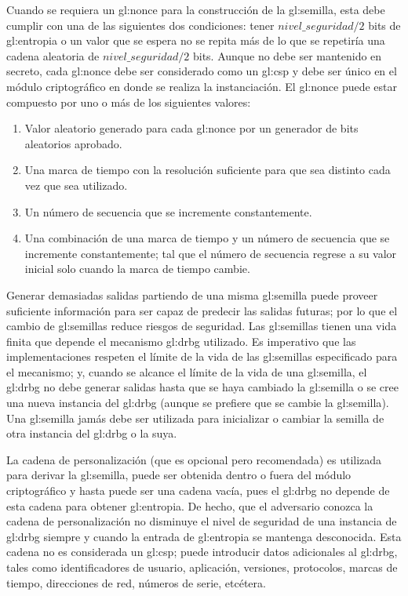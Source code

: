 Cuando se requiera un \gls{gl:nonce} para la construcción de la
\gls{gl:semilla}, esta debe cumplir con una de las siguientes dos condiciones:
tener $nivel\_seguridad/2$ bits de \gls{gl:entropia} o un valor que se espera
no se repita más de lo que se repetiría una cadena aleatoria de
$nivel\_seguridad/2$ bits. Aunque no debe ser mantenido en secreto, cada
\gls{gl:nonce} debe ser considerado como un \gls{gl:csp} y debe ser único en
el módulo criptográfico en donde se realiza la instanciación. El \gls{gl:nonce}
puede estar compuesto por uno o más de los siguientes valores:
\begin{enumerate}
  \item Valor aleatorio generado para cada \gls{gl:nonce} por un generador
    de bits aleatorios aprobado.
  \item Una marca de tiempo con la resolución suficiente para que sea distinto
    cada vez que sea utilizado.
  \item Un número de secuencia que se incremente constantemente.
  \item Una combinación de una marca de tiempo y un número de secuencia que se
    incremente constantemente; tal que el número de secuencia regrese a su
    valor inicial solo cuando la marca de tiempo cambie.
\end{enumerate}

Generar demasiadas salidas partiendo de una misma \gls{gl:semilla} puede proveer
suficiente información para ser capaz de predecir las salidas futuras; por lo
que el cambio de \glspl{gl:semilla} reduce riesgos de seguridad. Las
\glspl{gl:semilla} tienen una vida finita que depende el mecanismo \gls{gl:drbg}
utilizado. Es imperativo que las implementaciones respeten el límite de la vida
de las \glspl{gl:semilla} especificado para el mecanismo; y, cuando se alcance
el límite de la vida de una \gls{gl:semilla}, el \gls{gl:drbg} no debe generar
salidas hasta que se haya cambiado la \gls{gl:semilla} o se cree una nueva
instancia del \gls{gl:drbg} (aunque se prefiere que se cambie la
\gls{gl:semilla}). Una \gls{gl:semilla} jamás debe ser utilizada para
inicializar o cambiar la semilla de otra instancia del \gls{gl:drbg} o la suya.

La cadena de personalización (que es opcional pero recomendada) es utilizada
para derivar la \gls{gl:semilla}, puede ser obtenida dentro o fuera del
módulo criptográfico y hasta puede ser una cadena vacía, pues el \gls{gl:drbg}
no depende de esta cadena para obtener \gls{gl:entropia}. De hecho, que
el adversario conozca la cadena de personalización no disminuye el nivel de
seguridad de una instancia de \gls{gl:drbg} siempre y cuando la entrada de
\gls{gl:entropia} se mantenga desconocida. Esta cadena no es considerada un
\gls{gl:csp}; puede introducir datos adicionales al \gls{gl:drbg}, tales como
identificadores de usuario, aplicación, versiones, protocolos, marcas de tiempo,
direcciones de red, números de serie, etcétera.